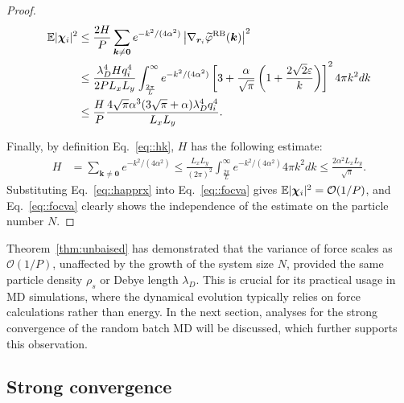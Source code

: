 \begin{proof}
	\begin{equation}\label{eq::focva}
		\begin{split}
			\mathbb{E}|\boldsymbol{\chi}_{i}|^2&\leq \frac{2H}{P}\sum_{\bm{k}\neq\bm{0}}e^{-k^2/(4\alpha^2)}\left|\nabla_{\bm{r}_i}\widetilde{\varphi}^{\text{RB}}(\bm{k})\right|^2\\
			&\leq \frac{\lambda_D^4Hq_i^4}{2PL_xL_y} \int_{\frac{2\pi}{L}}^{\infty}e^{-k^2/(4\alpha^2)}\left[3+\frac{\alpha}{\sqrt{\pi}}\left(1+\frac{2\sqrt{2}\varepsilon}{k}\right)\right]^24\pi k^2dk\\
			&\leq \frac{H}{P}\frac{4\sqrt{\pi}\alpha^3(3\sqrt{\pi}+\alpha)\lambda_D^4 q_{i}^4}{L_xL_y}.
		\end{split}
	\end{equation}
	
	Finally, by definition Eq.~\ref{eq::hk}, $H$ has the following estimate:
	\begin{equation}\label{eq::happrx}
		\begin{split}
			H&=\sum_{\bm{k}\neq\bm{0}}e^{-k^2/(4\alpha^2)}\leq \frac{L_xL_y}{(2\pi)^2}\int_{\frac{2\pi}{L}}^{\infty} e^{-k^2/(4\alpha^2)}4\pi k^2dk\leq \frac{2\alpha^2L_xL_y}{\sqrt{\pi}}.
		\end{split}
	\end{equation}
	Substituting Eq.~\eqref{eq::happrx} into Eq.~\eqref{eq::focva} gives $\mathbb{E}|\boldsymbol{\chi}_{i}|^2=\mathcal{O}(1/P)$, and Eq.~\eqref{eq::focva} clearly shows the independence of the estimate on the particle number $N$.
\end{proof}


Theorem~\ref{thm:unbaised} has demonstrated that the variance of force scales as $\mathcal{O}(1/P)$, unaffected by the growth of the system size $N$, provided the same particle density $\rho_s$ or Debye length $\lambda_D$. 
This is crucial for its practical usage in MD simulations, where the dynamical evolution typically relies on force calculations rather than energy. 
In the next section, analyses for the strong convergence of the random batch MD will be discussed, which further supports this observation.

\subsection{Strong convergence} \label{subsec::convergence}

